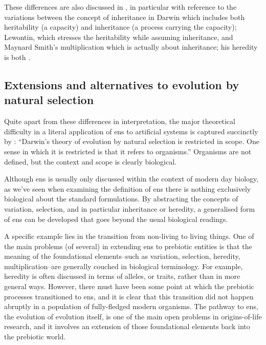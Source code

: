 These differences are also discussed in \textcite{Griesemer2001}, in particular with reference to the variations between the concept of inheritance in Darwin which includes both heritability (a capacity) and inheritance (a process carrying the capacity); Lewontin, which stresses the heritability while assuming inheritance, and Maynard Smith's multiplication which is actually about inheritance; his heredity is both \parencite{Griesemer2001}.

\subsection{Extensions and alternatives to evolution by natural selection}\label{alternatives-to-evolution-by-natural-selection}

Quite apart from these differences in interpretation, the major theoretical difficulty in a literal application of \gls{ens} to artificial systems is captured succinctly by \textcite{Griesemer2005}: ``Darwin's theory of evolution by natural selection is restricted in scope. One sense in which it is restricted is that it refers to organisms.'' Organisms are not defined, but the context and scope is clearly biological. 

Although \gls{ens} is usually only discussed within the context of modern day biology, as we've seen when examining the definition of \gls{ens} there is nothing exclusively biological about the standard formulations. By abstracting the concepts of variation, selection, and in particular inheritance or heredity, a generalised form of \gls{ens} can be developed that goes beyond the usual biological readings. 

A specific example lies in the transition from non-living to living things. One of the main problems (of several) in extending \gls{ens} to prebiotic entities is that the meaning of the foundational elements--such as variation, selection, heredity, multiplication--are generally couched in biological terminology. For example, heredity is often discussed in terms of alleles, or traits, rather than in more general ways. However, there must have been some point at which the prebiotic processes transitioned to \gls{ens}, and it is clear that this transition did not happen abruptly in a population of fully-fledged modern organisms. The pathway to \gls{ens}, the evolution of evolution itself, is one of the main open problems in origins-of-life research, and it involves an extension of those foundational elements back into the prebiotic world.

